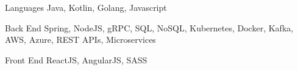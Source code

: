 


\begin{cvskills}
 

\cvskill
{Languages} %
{Java, Kotlin, Golang, Javascript} %


\cvskill
{Back End} %
{Spring, NodeJS, gRPC, SQL, NoSQL, Kubernetes, Docker, Kafka, AWS, Azure, REST APIs, Microservices} %


\cvskill
{Front End} %
{ReactJS, AngularJS, SASS} %


\end{cvskills}